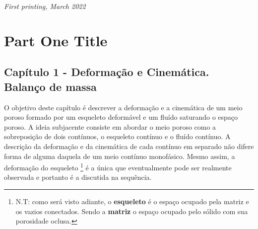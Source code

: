 \documentclass[
	11pt, %
	fleqn, %
	a4paper, %
]{LegrandOrangeBook}
\begin{document}
\noindent \textit{First printing, March 2022} %


\pagestyle{empty} %

\tableofcontents %

\listoffigures %

\listoftables %

\pagestyle{fancy} %

\cleardoublepage %


\part{Part One Title}


\chapterspaceabove{6.75cm} %
\chapterspacebelow{7.25cm} %


\chapter{Capítulo 1 - Deformação e Cinemática. Balanço de massa}

O objetivo deste capítulo é descrever a deformação e a cinemática de um meio poroso formado por um esqueleto deformável e um fluído saturando o espaço poroso. A ideia subjacente consiste em abordar o meio poroso como a sobreposição de dois contínuos, o esqueleto contínuo e o fluído contínuo. A descrição da deformação e da cinemática de cada contínuo em separado não difere forma de alguma daquela de um meio contínuo monofásico. Mesmo assim, a deformação do esqueleto \footnote{N.T: como será visto adiante, o \textbf{esqueleto} é o espaço ocupado pela matriz e os vazios conectados. Sendo a \textbf{matriz} o espaço ocupado pelo sólido com sua porosidade oclusa.} é a única que eventualmente pode ser realmente observada e portanto é a discutida na sequência.
\end{document}
